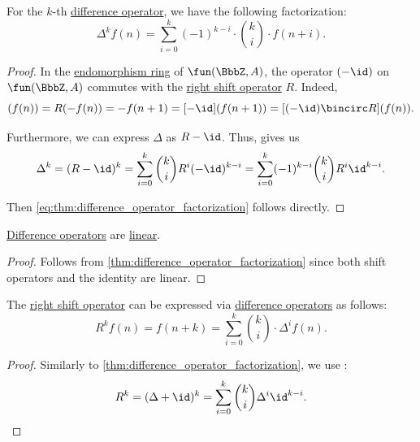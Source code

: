 \begin{proposition}\label{thm:difference_operator_factorization}
  For the \( k \)-th \hyperref[def:finite_difference_operator]{difference operator}, we have the following factorization:
  \begin{equation}\label{eq:thm:difference_operator_factorization}
    \Delta^k f(n) = \sum_{i=0}^k (-1)^{k-i} \cdot \binom k i \cdot f(n + i).
  \end{equation}
\end{proposition}
\begin{proof}
  In the \hyperref[def:endomorphism_semiring]{endomorphism ring} of \( \fun(\BbbZ, A) \), the operator \( (-\id) \) on \( \fun(\BbbZ, A) \) commutes with the \hyperref[def:sequence_shift_operator]{right shift operator} \( R \). Indeed,
  \begin{equation*}
    [R \bincirc (-\id)](f(n))
    =
    R(-f(n))
    =
    -f(n + 1)
    =
    [-\id](f(n + 1))
    =
    [(-\id) \bincirc R](f(n)).
  \end{equation*}

  Furthermore, we can express \( \Delta \) as \( R - \id \). Thus,  gives us
  \begin{equation*}
    \Delta^k
    =
    (R - \id)^k
    =
    \sum_{i=0}^k \binom k i R^i (-\id)^{k-i}
    =
    \sum_{i=0}^k (-1)^{k-i} \binom k i R^i \id^{k-i}.
  \end{equation*}

  Then \eqref{eq:thm:difference_operator_factorization} follows directly.
\end{proof}

\begin{corollary}\label{thm:difference_operator_linearity}
  \hyperref[def:finite_difference_operator]{Difference operators} are \hyperref[def:linear_function]{linear}.
\end{corollary}
\begin{proof}
  Follows from \cref{thm:difference_operator_factorization} since both shift operators and the identity are linear.
\end{proof}

\begin{proposition}\label{thm:successive_value_via_difference_operator}
  The \hyperref[def:sequence_shift_operator]{right shift operator} can be expressed via \hyperref[def:finite_difference_operator]{difference operators} as follows:
  \begin{equation}\label{eq:thm:successive_value_via_difference_operator}
    R^k f(n)
    =
    f(n + k)
    =
    \sum_{i=0}^k \binom k i \cdot \Delta^i f(n).
  \end{equation}
\end{proposition}
\begin{proof}
  Similarly to \cref{thm:difference_operator_factorization}, we use :
  \begin{equation*}
    R^k
    =
    (\Delta + \id)^k
    =
    \sum_{i=0}^k \binom k i \Delta^i \id^{k-i}.
  \end{equation*}
\end{proof}

